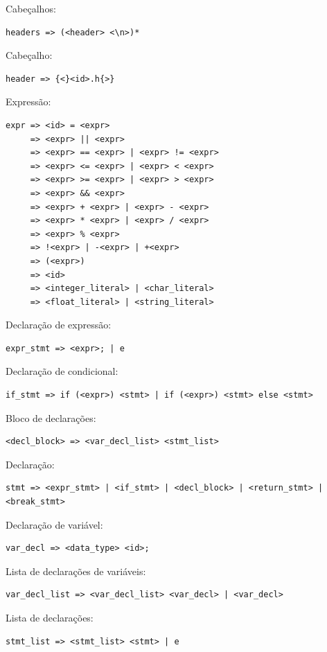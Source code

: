\documentclass[]{article}
\numberwithin{equation}{section}
\begin{document}
Cabeçalhos:
\begin{lstlisting}
headers => (<header> <\n>)*
\end{lstlisting}

Cabeçalho:
\begin{lstlisting}
header => {<}<id>.h{>}
\end{lstlisting}

Expressão:
\begin{lstlisting}
expr => <id> = <expr>
     => <expr> || <expr>
     => <expr> == <expr> | <expr> != <expr>
     => <expr> <= <expr> | <expr> < <expr>
     => <expr> >= <expr> | <expr> > <expr>
     => <expr> && <expr>
     => <expr> + <expr> | <expr> - <expr>
     => <expr> * <expr> | <expr> / <expr> 
     => <expr> % <expr>
     => !<expr> | -<expr> | +<expr>
     => (<expr>)
     => <id>
     => <integer_literal> | <char_literal> 
     => <float_literal> | <string_literal>
\end{lstlisting}

Declaração de expressão:
\begin{lstlisting}
expr_stmt => <expr>; | e
\end{lstlisting}

Declaração de condicional:
\begin{lstlisting}
if_stmt => if (<expr>) <stmt> | if (<expr>) <stmt> else <stmt>
\end{lstlisting}

Bloco de declarações:
\begin{lstlisting}
<decl_block> => <var_decl_list> <stmt_list>
\end{lstlisting}

Declaração:
\begin{lstlisting}
stmt => <expr_stmt> | <if_stmt> | <decl_block> | <return_stmt> | <break_stmt>
\end{lstlisting}

Declaração de variável:
\begin{lstlisting}
var_decl => <data_type> <id>;
\end{lstlisting}

Lista de declarações de variáveis:
\begin{lstlisting}
var_decl_list => <var_decl_list> <var_decl> | <var_decl>
\end{lstlisting}

Lista de declarações:
\begin{lstlisting}
stmt_list => <stmt_list> <stmt> | e
\end{lstlisting}
\end{document}
